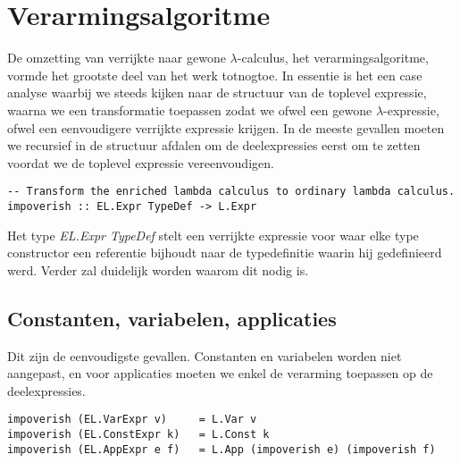 \documentclass[a4paper,10pt]{article}
\begin{document}
\section{Verarmingsalgoritme}
De omzetting van verrijkte naar gewone $\lambda$-calculus, het verarmingsalgoritme, vormde het grootste deel van het werk totnogtoe. In essentie is het een case analyse waarbij we steeds kijken naar de structuur van de toplevel expressie, waarna we een transformatie toepassen zodat we ofwel een gewone $\lambda$-expressie, ofwel een eenvoudigere verrijkte expressie krijgen. In de meeste gevallen moeten we recursief in de structuur afdalen om de deelexpressies eerst om te zetten voordat we de toplevel expressie vereenvoudigen.

\begin{lstlisting}
-- Transform the enriched lambda calculus to ordinary lambda calculus.
impoverish :: EL.Expr TypeDef -> L.Expr
\end{lstlisting}

Het type \emph{EL.Expr TypeDef} stelt een verrijkte expressie voor waar elke type constructor een referentie bijhoudt naar de typedefinitie waarin hij gedefinieerd werd. Verder zal duidelijk worden waarom dit nodig is.

\subsection{Constanten, variabelen, applicaties}
Dit zijn de eenvoudigste gevallen. Constanten en variabelen worden niet aangepast, en voor applicaties moeten we enkel de verarming toepassen op de deelexpressies.

\begin{lstlisting}
impoverish (EL.VarExpr v)     = L.Var v
impoverish (EL.ConstExpr k)   = L.Const k
impoverish (EL.AppExpr e f)   = L.App (impoverish e) (impoverish f)
\end{lstlisting}
\end{document}
